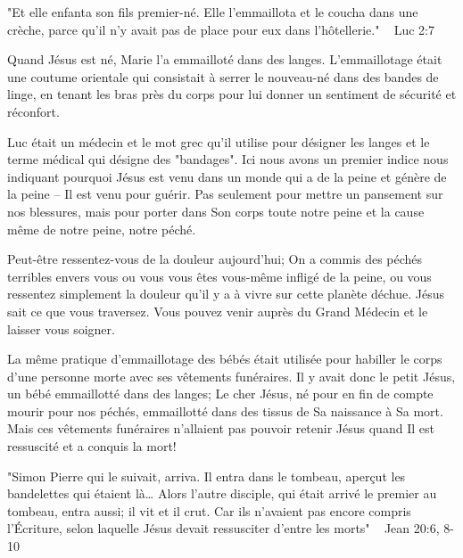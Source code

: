 
"Et elle enfanta son fils premier-né. Elle l'emmaillota et le coucha dans une crèche, parce qu'il n'y avait pas de place pour eux dans l'hôtellerie." ~ Luc 2:7

Quand Jésus est né, Marie l'a emmailloté dans des langes. L'emmaillotage était une coutume orientale qui consistait à serrer le nouveau-né dans des bandes de linge, en tenant les bras près du corps pour lui donner un sentiment de sécurité et réconfort.

Luc était un médecin et le mot grec qu'il utilise pour désigner les langes et le terme médical qui désigne des "bandages". Ici nous avons un premier indice nous indiquant pourquoi Jésus est venu dans un monde qui a de la peine et génère de la peine – Il est venu pour guérir. Pas seulement pour mettre un pansement sur nos blessures, mais pour porter dans Son corps toute notre peine et la cause même de notre peine, notre péché.

Peut-être ressentez-vous de la douleur aujourd'hui; On a commis des péchés terribles envers vous ou vous vous êtes vous-même infligé de la peine, ou vous ressentez simplement la douleur qu'il y a à vivre sur cette planète déchue. Jésus sait ce que vous traversez. Vous pouvez venir auprès du Grand Médecin et le laisser vous soigner.

La même pratique d'emmaillotage des bébés était utilisée pour habiller le corps d'une personne morte avec ses vêtements funéraires. Il y avait donc le petit Jésus, un bébé emmaillotté dans des langes; Le cher Jésus, né pour en fin de compte mourir pour nos péchés, emmaillotté dans des tissus de Sa naissance à Sa mort. Mais ces vêtements funéraires n'allaient pas pouvoir retenir Jésus quand Il est ressuscité et a conquis la mort!


"Simon Pierre qui le suivait, arriva. Il entra dans le tombeau, aperçut les bandelettes qui étaient là… Alors l’autre disciple, qui était arrivé le premier au tombeau, entra aussi; il vit et il crut. Car ils n’avaient pas encore compris l’Écriture, selon laquelle Jésus devait ressusciter d’entre les morts"
                                                     ~ Jean 20:6, 8-10 

